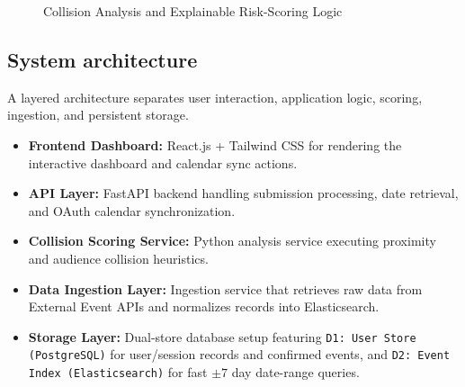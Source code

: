 \documentclass[12pt]{article}
\begin{document}
\begin{figure}[H]
\centering
{}
\caption{Collision Analysis and Explainable Risk-Scoring Logic}
\end{figure}

\subsection{System architecture}
A layered architecture separates user interaction, application logic, scoring, ingestion, and persistent storage.
\begin{itemize}[leftmargin=0.7cm]
\item \textbf{Frontend Dashboard:} React.js + Tailwind CSS for rendering the interactive dashboard and calendar sync actions.
\item \textbf{API Layer:} FastAPI backend handling submission processing, date retrieval, and OAuth calendar synchronization.
\item \textbf{Collision Scoring Service:} Python analysis service executing proximity and audience collision heuristics.
\item \textbf{Data Ingestion Layer:} Ingestion service that retrieves raw data from External Event APIs and normalizes records into Elasticsearch.
\item \textbf{Storage Layer:} Dual-store database setup featuring \texttt{D1: User Store (PostgreSQL)} for user/session records and confirmed events, and \texttt{D2: Event Index (Elasticsearch)} for fast $\pm 7$ day date-range queries.
\end{itemize}
\end{document}
